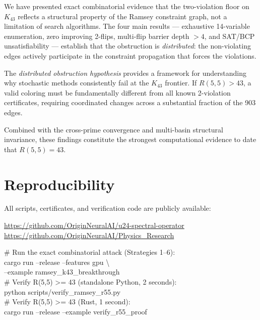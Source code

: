 \documentclass[11pt,a4paper]{article}
\theoremstyle{plain}
\theoremstyle{remark}
\begin{document}
We have presented exact combinatorial evidence that the two-violation
floor on $K_{43}$ reflects a structural property of the Ramsey
constraint graph, not a limitation of search algorithms. The four
main results --- exhaustive 14-variable enumeration, zero improving
2-flips, multi-flip barrier depth $> 4$, and SAT/BCP unsatisfiability
--- establish that the obstruction is \emph{distributed}: the
non-violating edges actively participate in the constraint
propagation that forces the violations.

The \emph{distributed obstruction hypothesis} provides a framework
for understanding why stochastic methods consistently fail at the
$K_{43}$ frontier. If $R(5,5) > 43$, a valid coloring must be
fundamentally different from all known 2-violation certificates,
requiring coordinated changes across a substantial fraction of the
903 edges.

Combined with the cross-prime convergence and multi-basin structural
invariance, these findings constitute the strongest computational
evidence to date that $R(5,5) = 43$.

\section{Reproducibility}

All scripts, certificates, and verification code are publicly
available:

\begin{center}
\url{https://github.com/OriginNeuralAI/u24-spectral-operator}\\
\url{https://github.com/OriginNeuralAI/Physics_Research}
\end{center}

\begin{tcolorbox}[colback=reedsbg, colframe=accent!50, fontupper=\small\ttfamily,
  title={\small\bfseries Reproduction Commands}, coltitle=white,
  colbacktitle=accent]
\# Run the exact combinatorial attack (Strategies 1--6):\\
cargo run --release --features gpu \textbackslash\\
\quad --example ramsey\_k43\_breakthrough\\[4pt]
\# Verify R(5,5) >= 43 (standalone Python, 2 seconds):\\
python scripts/verify\_ramsey\_r55.py\\[4pt]
\# Verify R(5,5) >= 43 (Rust, 1 second):\\
cargo run --release --example verify\_r55\_proof
\end{tcolorbox}
\end{document}

